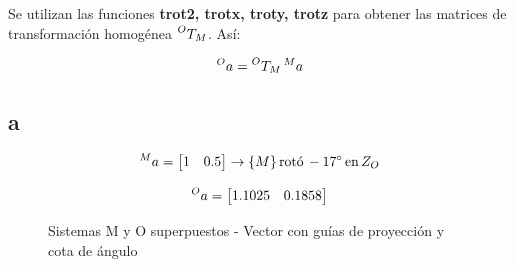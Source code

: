 \documentclass[a4paper,12pt]{article}
\begin{document}
Se utilizan las funciones \textbf{trot2, trotx, troty, trotz} para obtener las matrices de transformación
homogénea $\prescript{O}{}{T_M}$. Así:

\begin{equation}
    \prescript{O}{}{a} = \prescript{O}{}{T_M}\prescript{M}{}{a}
    \label{transformacion}
\end{equation}


\subsection{a}
\begin{equation*}
    \prescript{M}{}{a} = 
    \begin{bmatrix}
        1 & 0.5
    \end{bmatrix}
    \rightarrow \{M\} \, \text{rotó} \,  -17^\circ \, \text{en}\, Z_O
\end{equation*}

\begin{equation*}
    \prescript{O}{}{a} = 
    \begin{bmatrix}
        1.1025 & 0.1858
    \end{bmatrix}
\end{equation*}

\begin{figure}[H]
    \centering
    \begin{adjustbox}{scale = 0.85, max width=\columnwidth}
    \end{adjustbox}
    \caption{Sistemas M y O superpuestos - Vector con guías de proyección y cota de ángulo}
\end{figure}
\end{document}
